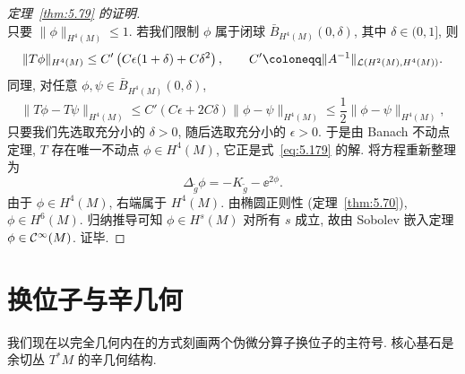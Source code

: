 \begin{proof}[定理~\ref{thm:5.79} 的证明]
\begin{equation}
\end{equation}
只要 $\|\phi\|_{H^4(M)} \le 1$. 若我们限制 $\phi$ 属于闭球 $\bar{B}_{H^4(M)}(0, \delta)$, 其中 $\delta \in (0, 1]$, 则
\begin{equation}\label{eq:5.184}
    \|T \phi\|_{H^4(M)} \le C' \left( C \epsilon(1 + \delta) + C \delta^2 \right), \qquad C' \defeq \|A^{-1}\|_{\mathcal{L}(H^2(M), H^4(M))}.
\end{equation}
同理, 对任意 $\phi, \psi \in \bar{B}_{H^4(M)}(0, \delta)$,
\begin{equation}\label{eq:5.185}
    \|T \phi - T \psi\|_{H^4(M)} \le C' \left( C \epsilon + 2 C \delta \right) \|\phi - \psi\|_{H^4(M)} \le \frac{1}{2} \|\phi - \psi\|_{H^4(M)},
\end{equation}
只要我们先选取充分小的 $\delta > 0$, 随后选取充分小的 $\epsilon > 0$. 于是由 Banach 不动点定理, $T$ 存在唯一不动点 $\phi \in H^4(M)$, 它正是式~\eqref{eq:5.179} 的解. 将方程重新整理为
\begin{equation}\label{eq:5.186}
    \Delta_{\tilde{g}} \phi = -K_{\tilde{g}} - \ee^{2\phi}.
\end{equation}
由于 $\phi \in H^4(M)$, 右端属于 $H^4(M)$. 由椭圆正则性 (定理~\ref{thm:5.70}), $\phi \in H^6(M)$. 归纳推导可知 $\phi \in H^s(M)$ 对所有 $s$ 成立, 故由 Sobolev 嵌入定理 $\phi \in \mathcal{C}^\infty(M)$. 证毕.
\end{proof}

\section{换位子与辛几何}\label{sec:5.14}
%
%
%

我们现在以完全几何内在的方式刻画两个伪微分算子换位子的主符号. 核心基石是余切丛 $T^* M$ 的辛几何结构.

